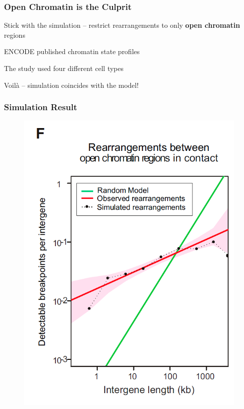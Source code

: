 \documentclass[svgnames,14pt]{beamer}
\begin{document}
\begin{frame}
\frametitle{Open Chromatin is the Culprit}
Stick with the simulation -- restrict rearrangements to only \textbf{open chromatin} regions
\vspace{12pt}

ENCODE published chromatin state profiles
\vspace{12pt}

The study used four different cell types
\vspace{12pt}

\pause
Voilà -- simulation coincides with the model!
\end{frame}

\begin{frame}
\frametitle{Simulation Result}
\begin{figure}
	\centering
	\includegraphics[scale = .38]{SimResult3.png}
\end{figure}
\end{frame}
\end{document}

